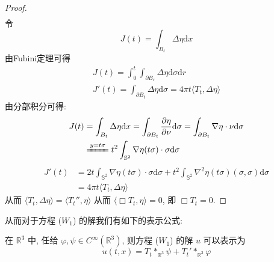 \documentclass[11pt]{ctexart}[UTF8]
\begin{document}
\begin{proof}
\begin{equation*}
\begin{aligned}
        \end{aligned}
    \end{equation*}
    令
    \begin{equation*}
        J(t) = \int_{B_{t}}  \Delta\eta \mathrm{d}x
    \end{equation*}
    由Fubini定理可得
    \begin{equation*}
        \begin{aligned}
                    J(t) = \int_{0}^{t} \int_{\partial B_{r}} \Delta\eta \mathrm{d}\sigma \mathrm{d}r\\
                    J'(t) = \int_{\partial B_{t}} \Delta\eta \mathrm{d}\sigma=4\pi t\langle T_{t}, \Delta\eta \rangle
        \end{aligned}
    \end{equation*}
    由分部积分可得:
    \begin{equation*}
        \begin{aligned}
            J(t) &= \int_{B_{t}}  \Delta\eta \mathrm{d}x = \int_{\partial B_{t}} \frac{\partial \eta}{\partial \nu} \mathrm{d}\sigma= \int_{\partial B_{t}} \nabla\eta \cdot \nu \mathrm{d}\sigma\\
            &\xlongequal{y=t\sigma} t^2\int_{\mathbb{S}^{2}}  \nabla\eta(t\sigma) \cdot \sigma \mathrm{d}\sigma
        \end{aligned}
    \end{equation*}
    \begin{equation*}
        \begin{aligned}
            J'(t) &= 2t\int_{\mathbb{S}^{2}}  \nabla\eta(t\sigma) \cdot \sigma \mathrm{d}\sigma + t^2\int_{\mathbb{S}^{2}}  \nabla^{2}\eta(t\sigma)(\sigma,\sigma) \mathrm{d}\sigma\\
            &= 4\pi t\langle T_{t}, \Delta\eta \rangle
        \end{aligned}
    \end{equation*}
    从而 $\langle T_{t}, \Delta\eta \rangle = \langle T_{t}'', \eta \rangle$ 从而 $\langle \Box T_{t}, \eta \rangle = 0$, 即 $\Box T_{t} = 0$.
\end{proof}
从而对于方程 ($W_{1}$) 的解我们有如下的表示公式:
\begin{theorem}
    在 $\mathbb{R}^{3}$ 中, 任给 $\varphi,\psi \in C^{\infty}(\mathbb{R}^{3})$, 则方程 ($W_{1}$) 的解 $u$ 可以表示为
    \begin{equation}\label{Kirchhoff formula}
        u(t,x) = T_{t} \ast_{\mathbb{R}^{3}} \psi + T_{t}' \ast_{\mathbb{R}^{3}} \varphi
    \end{equation}
\end{theorem}
\end{document}
